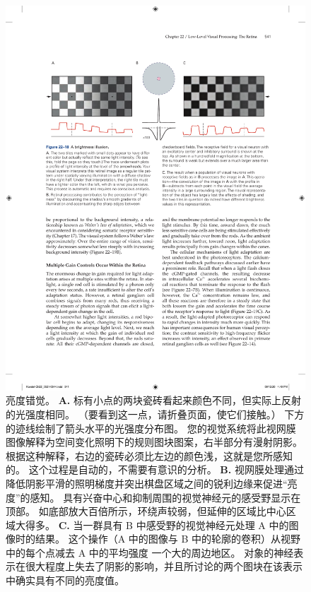 \begin{figure}[htbp]
	\centering
	\includegraphics[width=1.0\linewidth]{chap22/fig_22_18}
	\caption{亮度错觉。 
		\textbf{A.} 标有小点的两块瓷砖看起来颜色不同，但实际上反射的光强度相同。
		（要看到这一点，请折叠页面，使它们接触。）
		下方的迹线绘制了箭头水平的光强度分布图。 
		您的视觉系统将此视网膜图像解释为空间变化照明下的规则图块图案，右半部分有漫射阴影。 
		根据这种解释，右边的瓷砖必须比左边的颜色浅，这就是您所感知的。
		这个过程是自动的，不需要有意识的分析。 
		\textbf{B.} 视网膜处理通过降低阴影平滑的照明梯度并突出棋盘区域之间的锐利边缘来促进“亮度”的感知。 
		具有兴奋中心和抑制周围的视觉神经元的感受野显示在顶部。 
		如底部放大百倍所示，环绕声较弱，但延伸的区域比中心区域大得多。
		\textbf{C.} 当一群具有 B 中感受野的视觉神经元处理 A 中的图像时的结果。
		这个操作（A 中的图像与 B 中的轮廓的卷积）从视野中的每个点减去 A 中的平均强度 一个大的周边地区。
		对象的神经表示在很大程度上失去了阴影的影响，并且所讨论的两个图块在该表示中确实具有不同的亮度值。}
	\label{fig:22_18}
\end{figure}


